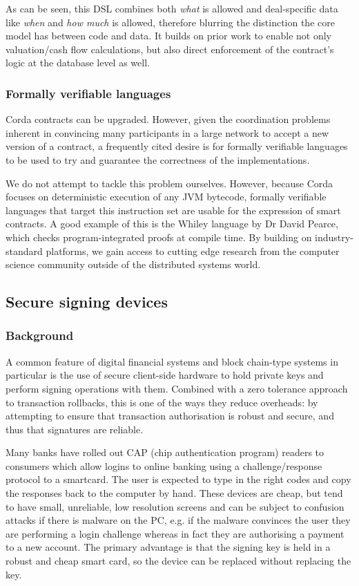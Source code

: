 \documentclass{article}
\begin{document}
As can be seen, this DSL combines both \emph{what} is allowed and deal-specific data like \emph{when} and \emph{how
much} is allowed, therefore blurring the distinction the core model has between code and data. It builds on prior
work to enable not only valuation/cash flow calculations, but also direct enforcement of the contract's logic at
the database level as well.

\subsubsection{Formally verifiable languages}

Corda contracts can be upgraded. However, given the coordination problems inherent in convincing many participants
in a large network to accept a new version of a contract, a frequently cited desire is for formally verifiable
languages to be used to try and guarantee the correctness of the implementations.

We do not attempt to tackle this problem ourselves. However, because Corda focuses on deterministic execution of
any JVM bytecode, formally verifiable languages that target this instruction set are usable for the expression
of smart contracts. A good example of this is the Whiley language by Dr David Pearce\cite{Pearce2015191}, which
checks program-integrated proofs at compile time. By building on industry-standard platforms, we gain access to
cutting edge research from the computer science community outside of the distributed systems world.

\subsection{Secure signing devices}\label{sec:secure-signing-devices}

\subsubsection{Background}

A common feature of digital financial systems and block chain-type systems in particular is the use of secure
client-side hardware to hold private keys and perform signing operations with them. Combined with a zero tolerance
approach to transaction rollbacks, this is one of the ways they reduce overheads: by attempting to ensure that
transaction authorisation is robust and secure, and thus that signatures are reliable.

Many banks have rolled out CAP (chip authentication program) readers to consumers which allow logins to online
banking using a challenge/response protocol to a smartcard. The user is expected to type in the right codes and
copy the responses back to the computer by hand. These devices are cheap, but tend to have small, unreliable, low
resolution screens and can be subject to confusion attacks if there is malware on the PC, e.g. if the malware
convinces the user they are performing a login challenge whereas in fact they are authorising a payment to a new
account. The primary advantage is that the signing key is held in a robust and cheap smart card, so the device can
be replaced without replacing the key.
\end{document}
